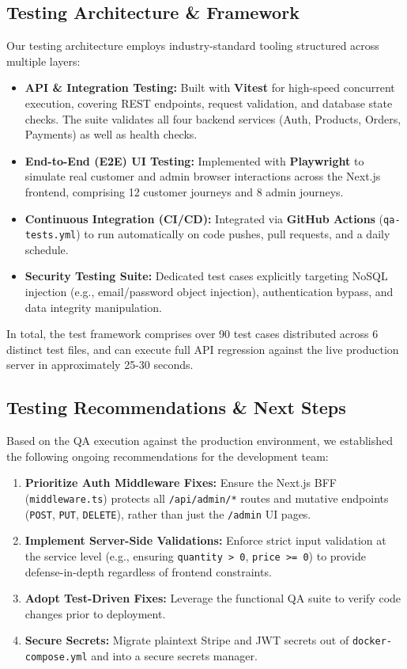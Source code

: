 \subsection*{Testing Architecture \& Framework}
Our testing architecture employs industry-standard tooling structured across multiple layers:
\begin{itemize}
    \item \textbf{API \& Integration Testing:} Built with \textbf{Vitest} for high-speed concurrent execution, covering REST endpoints, request validation, and database state checks. The suite validates all four backend services (Auth, Products, Orders, Payments) as well as health checks.
    \item \textbf{End-to-End (E2E) UI Testing:} Implemented with \textbf{Playwright} to simulate real customer and admin browser interactions across the Next.js frontend, comprising 12 customer journeys and 8 admin journeys.
    \item \textbf{Continuous Integration (CI/CD):} Integrated via \textbf{GitHub Actions} (\texttt{qa-tests.yml}) to run automatically on code pushes, pull requests, and a daily schedule.
    \item \textbf{Security Testing Suite:} Dedicated test cases explicitly targeting NoSQL injection (e.g., email/password object injection), authentication bypass, and data integrity manipulation.
\end{itemize}
In total, the test framework comprises over 90 test cases distributed across 6 distinct test files, and can execute full API regression against the live production server in approximately 25-30 seconds.

\subsection*{Testing Recommendations \& Next Steps}
Based on the QA execution against the production environment, we established the following ongoing recommendations for the development team:
\begin{enumerate}
    \item \textbf{Prioritize Auth Middleware Fixes:} Ensure the Next.js BFF (\texttt{middleware.ts}) protects all \texttt{/api/admin/*} routes and mutative endpoints (\texttt{POST}, \texttt{PUT}, \texttt{DELETE}), rather than just the \texttt{/admin} UI pages.
    \item \textbf{Implement Server-Side Validations:} Enforce strict input validation at the service level (e.g., ensuring \texttt{quantity > 0}, \texttt{price >= 0}) to provide defense-in-depth regardless of frontend constraints.
    \item \textbf{Adopt Test-Driven Fixes:} Leverage the functional QA suite to verify code changes prior to deployment.
    \item \textbf{Secure Secrets:} Migrate plaintext Stripe and JWT secrets out of \texttt{docker-compose.yml} and into a secure secrets manager.
\end{enumerate}

